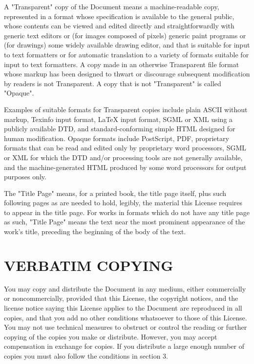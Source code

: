 A "Transparent" copy of the Document means a machine-readable copy,
represented in a format whose specification is available to the general
public, whose contents can be viewed and edited directly and
straightforwardly with generic text editors or (for images composed of
pixels) generic paint programs or (for drawings) some widely available
drawing editor, and that is suitable for input to text formatters or for
automatic translation to a variety of formats suitable for input to text
formatters. A copy made in an otherwise Transparent file format whose
markup has been designed to thwart or discourage subsequent modification
by readers is not Transparent. A copy that is not "Transparent" is
called "Opaque".

Examples of suitable formats for Transparent copies include plain ASCII
without markup, Texinfo input format, LaTeX input format, SGML or XML
using a publicly available DTD, and standard-conforming simple HTML
designed for human modification. Opaque formats include PostScript, PDF,
proprietary formats that can be read and edited only by proprietary word
processors, SGML or XML for which the DTD and/or processing tools are
not generally available, and the machine-generated HTML produced by some
word processors for output purposes only.

The "Title Page" means, for a printed book, the title page itself, plus
such following pages as are needed to hold, legibly, the material this
License requires to appear in the title page. For works in formats which
do not have any title page as such, "Title Page" means the text near the
most prominent appearance of the work's title, preceding the beginning
of the body of the text.

\section{VERBATIM COPYING}\label{gfdl-2}

You may copy and distribute the Document in any medium, either
commercially or noncommercially, provided that this License, the
copyright notices, and the license notice saying this License applies to
the Document are reproduced in all copies, and that you add no other
conditions whatsoever to those of this License. You may not use
technical measures to obstruct or control the reading or further copying
of the copies you make or distribute. However, you may accept
compensation in exchange for copies. If you distribute a large enough
number of copies you must also follow the conditions in section 3.

